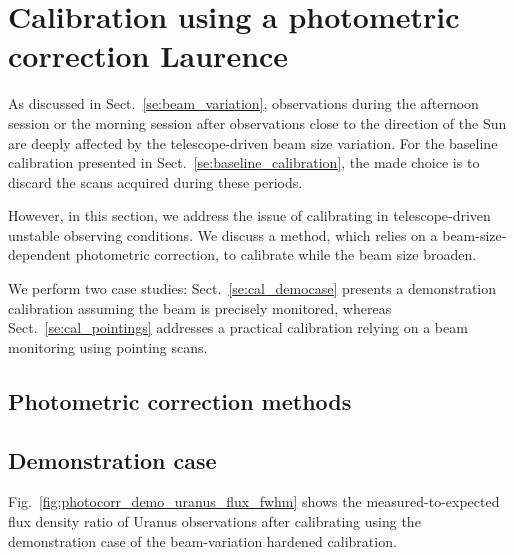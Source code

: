 \section{Calibration using a photometric correction {\color{blue} Laurence} }

As discussed in Sect.~\ref{se:beam_variation}, observations during the
afternoon session or the morning session after observations close to the
direction of the Sun are deeply affected by the telescope-driven beam
size variation. For the baseline calibration presented in
Sect.~\ref{se:baseline_calibration}, the made choice is to discard the
scans acquired during these periods.

However, in this section, we address the issue of calibrating in
telescope-driven unstable observing conditions. We discuss a method,
which relies on a beam-size-dependent photometric correction, to
calibrate while the beam size broaden.

We perform two case studies: Sect.~\ref{se:cal_democase} presents a demonstration
calibration assuming the beam is precisely monitored, whereas
Sect.~\ref{se:cal_pointings} addresses a practical calibration relying
on a beam monitoring using pointing scans. 

\subsection{Photometric correction methods}
\label{se:photocorr_methods}


\subsection{Demonstration case}
\label{se:photocorr_demo}


Fig.~\ref{fig:photocorr_demo_uranus_flux_fwhm} shows the
measured-to-expected flux density ratio of Uranus observations after
calibrating using the demonstration case of the beam-variation
hardened calibration. 

